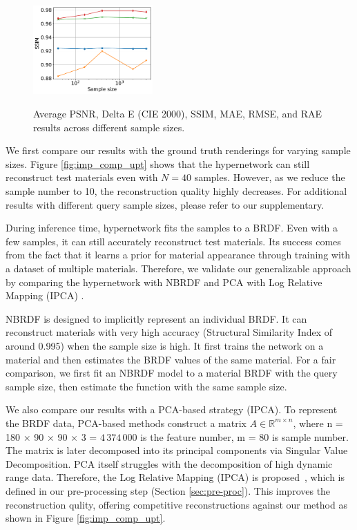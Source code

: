 \begin{figure}[t]
    {\includegraphics[width=0.32\linewidth, height=3.4cm]{Chapters/hyperbrdf-figs/SSIM_ggx.pdf}}
   \caption{Average PSNR, Delta E (CIE 2000), SSIM, MAE, RMSE, and RAE results across different sample sizes. }
   \label{fig:imp_plots}
\end{figure}



We first compare our results with the ground truth renderings for varying sample sizes. Figure \ref{fig:imp_comp_upt} shows that the hypernetwork can still reconstruct test materials even with $N = 40$ samples. However, as we reduce the sample number to 10, the reconstruction quality highly decreases. For additional results with different query sample sizes, please refer to our supplementary.


During inference time, hypernetwork fits the samples to a BRDF. Even with a few samples, it can still accurately reconstruct test materials. Its success comes from the fact that it learns a prior for material appearance through training with a dataset of multiple materials. Therefore, we validate our generalizable approach by comparing the hypernetwork with NBRDF \cite{sztrajman2021neural} and PCA with Log Relative Mapping (IPCA) \cite{nielsen2015optimal}.


NBRDF \cite{sztrajman2021neural} is designed to implicitly represent an individual BRDF. It can reconstruct materials with very high accuracy (Structural Similarity Index of around 0.995) when the sample size is high. It first trains the network on a material and then estimates the BRDF values of the same material. For a fair comparison, we first fit an NBRDF model to a material BRDF with the query sample size, then estimate the function with the same sample size. 

We also compare our results with a PCA-based strategy (IPCA). To represent the BRDF data, PCA-based methods  \cite{matusik2003data, ngan2006image} construct a matrix ${A} \in \mathbb{R}^{m \times n}$, where n = 180 × 90 × 90 × 3 = $4\,374\,000$ is the feature number, m = 80 is sample number. The matrix is later decomposed into its principal components via Singular Value Decomposition. PCA itself struggles with the decomposition of high dynamic range data. Therefore, the Log Relative Mapping (IPCA) is proposed~\cite{nielsen2015optimal}, which is defined in our pre-processing step (Section \ref{sec:pre-proc}). This improves the reconstruction qulity, offering competitive reconstructions against our method as shown in Figure \ref{fig:imp_comp_upt}.


